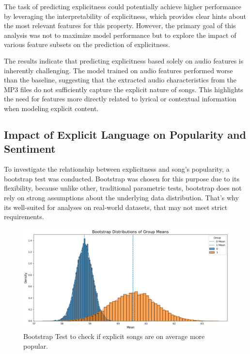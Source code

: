 The task of predicting explicitness could potentially achieve higher
performance by leveraging the interpretability of explicitness, which provides
clear hints about the most relevant features for this property. However, the
primary goal of this analysis was not to maximize model performance but to
explore the impact of various feature subsets on the prediction of
explicitness.

The results indicate that predicting explicitness based solely on audio
features is inherently challenging. The model trained on audio features
performed worse than the baseline, suggesting that the extracted audio
characteristics from the MP3 files do not sufficiently capture the explicit
nature of songs. This highlights the need for features more directly related to
lyrical or contextual information when modeling explicit content.



\subsection{Impact of Explicit Language on Popularity and Sentiment}
\label{sec:explicitmorepopular}

To investigate the relationship between explicitness and song's popularity, a
bootstrap test was conducted. Bootstrap was chosen for this purpose due to its
flexibility, because unlike other, traditional parametric tests, bootstrap does
not rely on strong assumptions about the underlying data distribution. That's
why its well-suited for analyses on real-world datasets, that may not meet
strict requirements.



\begin{center}
\begin{figure}[H]
  \centering
  \includegraphics[width=6in]{img/explicitness_bootstrap.png}
  \caption{Bootstrap Test to check if explicit songs are on average more
  popular.}
  \label{Figure:explicitness_bootstrap}
\end{figure}
\end{center}



